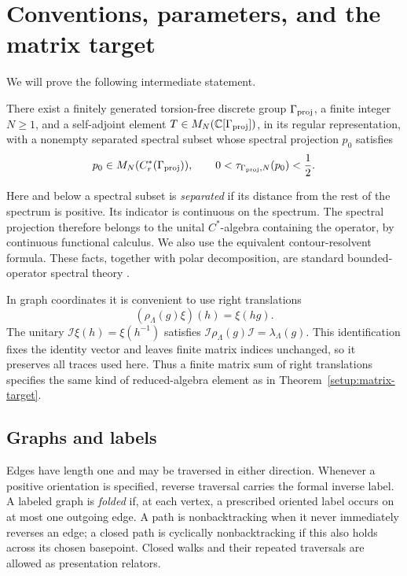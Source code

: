 \section{Conventions, parameters, and the matrix target}
\label{sec:setup}

We will prove the following intermediate statement.

\begin{theorem}
\label{setup:matrix-target}
There exist a finitely generated torsion-free discrete group
\(\Gamma_{\mathrm{proj}}\), a finite integer \(N\ge1\), and a self-adjoint element
\(T\in M_N(\mathbb C[\Gamma_{\mathrm{proj}}])\), in its regular representation,
with a nonempty separated spectral subset whose spectral projection
\(p_0\) satisfies
\[
 p_0\in M_N(C_r^*(\Gamma_{\mathrm{proj}})),\qquad
 0<\tau_{\Gamma_{\mathrm{proj}},N}(p_0)<\frac12.
\]
\end{theorem}

Here and below a spectral subset is \emph{separated} if its distance
from the rest of the spectrum is positive. Its indicator is
continuous on the spectrum. The spectral projection therefore
belongs to the unital \(C^*\)-algebra containing the operator,
by continuous functional calculus. We also use the equivalent
contour-resolvent formula. These facts, together with polar
decomposition, are standard bounded-operator spectral theory
\cite[Chapters~VI--VII]{ReedSimon1980}.

In graph coordinates it is convenient to use right translations
\[
 (\rho_\Lambda(g)\xi)(h)=\xi(hg).
\]
The unitary \(\mathcal I\xi(h)=\xi(h^{-1})\) satisfies
\(\mathcal I\rho_\Lambda(g)\mathcal I=\lambda_\Lambda(g)\).
This identification fixes the identity vector and leaves finite
matrix indices unchanged, so it preserves all traces used here.
Thus a finite matrix sum of right translations specifies the same
kind of reduced-algebra element as in Theorem~\ref{setup:matrix-target}.

\subsection{Graphs and labels}

Edges have length one and may be traversed in either direction.
Whenever a positive orientation is specified, reverse traversal
carries the formal inverse label.
A labeled graph is \emph{folded} if, at each vertex, a prescribed
oriented label occurs on at most one outgoing edge.
A path is nonbacktracking when it never immediately reverses an
edge; a closed path is cyclically nonbacktracking if this also
holds across its chosen basepoint.
Closed walks and their repeated traversals are allowed as
presentation relators.

